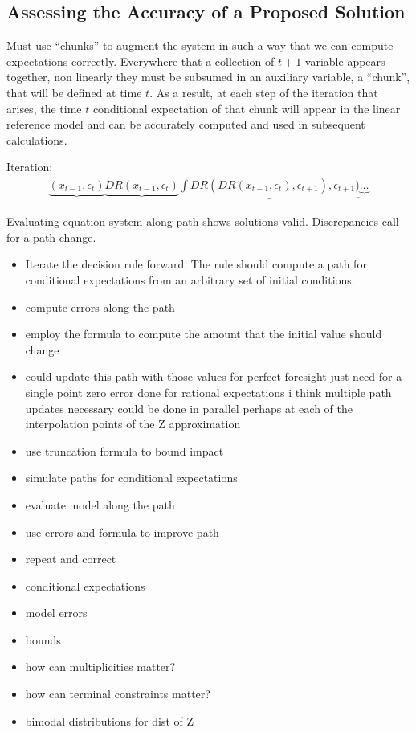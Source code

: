 \documentclass[12pt]{article}
\begin{document}
\subsection{Assessing the Accuracy of a Proposed Solution}
\label{sec:decis-rule-assessm}

Must use ``chunks'' to augment the system in such a way that we
can compute expectations correctly.
Everywhere that a collection of 
$t+1$ variable appears together, non linearly they must be subsumed in an
auxiliary variable, a ``chunk'', 
that will be defined at time $t$.  As a result, at each step
of the iteration that arises, the time $t$
conditional expectation of that chunk will appear in the 
linear reference model and can be accurately computed and
used in subsequent calculations.


Iteration:
\begin{gather}
\underbrace{(x_{t-1},\epsilon_t)} 
\underbrace{DR(x_{t-1},\epsilon_t)}
\underbrace{\int DR(DR(x_{t-1},\epsilon_t),\epsilon_{t+1}),\epsilon_{t+1})}
\underbrace{\ldots}
\end{gather}

Evaluating equation system along path shows solutions valid. Discrepancies call for a path change.

\label{sec:assess}
\begin{itemize}
\item Iterate the decision rule forward.  The rule should compute a path for conditional expectations from an arbitrary set of initial conditions.
\item compute errors along the path
\item employ the formula to compute the amount that the initial value should change
\item could update this path with those values for perfect foresight
just need for a single point zero error done for rational expectations 
i think multiple path updates necessary could be done in parallel perhaps at each of the interpolation points of the Z approximation
\item use truncation formula to bound impact
\end{itemize}









\begin{itemize}
\item simulate paths for conditional expectations
\item evaluate model along the path
\item use errors and formula to improve path 
\item repeat and correct
\item conditional expectations
\item model errors
\item bounds
\item how can multiplicities matter?  
\item how can terminal constraints matter?
\item bimodal distributions for dist of Z
\end{itemize}
\end{document}
